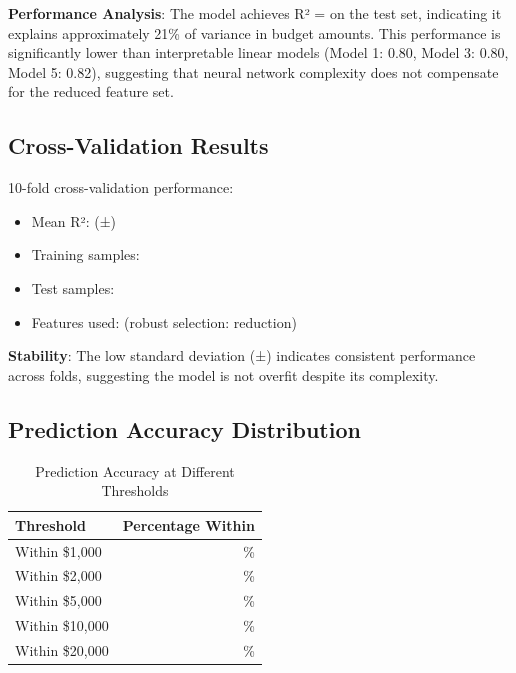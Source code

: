 \textbf{Performance Analysis}: The model achieves R² = \ModelTenRSquaredTest{} on the test set, indicating it explains approximately 21\% of variance in budget amounts. This performance is significantly lower than interpretable linear models (Model 1: 0.80, Model 3: 0.80, Model 5: 0.82), suggesting that neural network complexity does not compensate for the reduced feature set.

\subsection{Cross-Validation Results}

10-fold cross-validation performance:
\begin{itemize}
    \item Mean R²: \ModelTenCVMean{} (±\ModelTenCVStd{})
    \item Training samples: \ModelTenTrainingSamples{}
    \item Test samples: \ModelTenTestSamples{}
    \item Features used: \ModelTenRobustFeatures{} (robust selection: \ModelTenFeatureReduction{} reduction)
\end{itemize}

\textbf{Stability}: The low standard deviation (±\ModelTenCVStd{}) indicates consistent performance across folds, suggesting the model is not overfit despite its complexity.

\subsection{Prediction Accuracy Distribution}

\begin{table}[h]
\centering
\caption{Prediction Accuracy at Different Thresholds}
\begin{tabular}{lr}
\toprule
\textbf{Threshold} & \textbf{Percentage Within} \\
\midrule
Within \$1,000 & \ModelTenWithinOneK{}\% \\
Within \$2,000 & \ModelTenWithinTwoK{}\% \\
Within \$5,000 & \ModelTenWithinFiveK{}\% \\
Within \$10,000 & \ModelTenWithinTenK{}\% \\
Within \$20,000 & \ModelTenWithinTwentyK{}\% \\
\bottomrule
\end{tabular}
\end{table}


